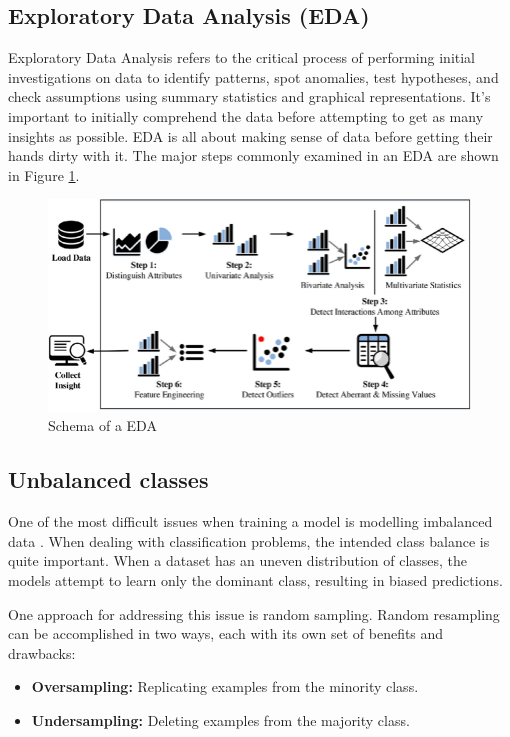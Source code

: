 \subsection{Exploratory Data Analysis (EDA)} \label{4eda}

Exploratory Data Analysis refers to the critical process of performing initial investigations on data to identify patterns, spot anomalies, test hypotheses, and check assumptions using summary statistics and graphical representations. It's important to initially comprehend the data before attempting to get as many insights as possible. EDA is all about making sense of data before getting their hands dirty with it. The major steps commonly examined in an EDA are shown in Figure \ref{fig:eda}.

\begin{figure}[H]
\centering
\includegraphics[scale=0.4]{img/EDAschema.PNG}
\caption{Schema of a EDA}
\label{fig:eda}
\end{figure}

\subsection{Unbalanced classes} \label{3unbclass}

One of the most difficult issues when training a model is modelling imbalanced data \cite{smote1}. When dealing with classification problems, the intended class balance is quite important. When a dataset has an uneven distribution of classes, the models attempt to learn only the dominant class, resulting in biased predictions.

One approach for addressing this issue is random sampling. Random resampling can be accomplished in two ways, each with its own set of benefits and drawbacks:

\begin{itemize}
    \item \textbf{Oversampling:} Replicating examples from the minority class.
    \item \textbf{Undersampling:} Deleting examples from the majority class.
\end{itemize}

